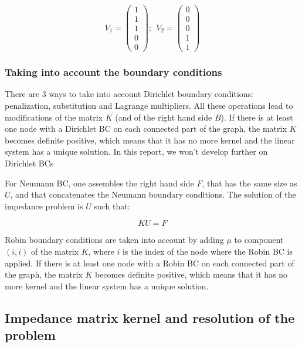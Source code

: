 \documentclass[11pt,a4paper]{article}		%
\begin{document}
\begin{equation}
V_1 = \begin{pmatrix} 1\\1\\1\\0\\0  \end{pmatrix}; \ \ V_2 = \begin{pmatrix} 0\\0\\0\\1\\1  \end{pmatrix}
\end{equation}

\subsubsection{Taking into account the boundary conditions}

There are 3 ways to take into account Dirichlet boundary conditions: penalization, substitution and Lagrange multipliers. All these operations lead to modifications of the matrix $K$ (and of the right hand side $B$). If there is at least one node with a Dirichlet BC on each connected part of the graph, the matrix $K$ becomes definite positive, which means that it has no more kernel and the linear system has a unique solution. In this report, we won't develop further on Dirichlet BCs

For Neumann BC, one assembles the right hand side $F$, that has the same size as $U$, and that concatenates the Neumann boundary conditions. The solution of the impedance problem is $U$ such that:

\begin{equation}
KU = F
\end{equation}

Robin boundary conditions are taken into account by adding $\mu$ to component $(i,i)$ of the matrix $K$, where $i$ is the index of the node where the Robin BC is applied. If there is at least one node with a Robin BC on each connected part of the graph, the matrix $K$ becomes definite positive, which means that it has no more kernel and the linear system has a unique solution.

\subsection{Impedance matrix kernel and resolution of the problem} \label{part:solve}
\end{document}
